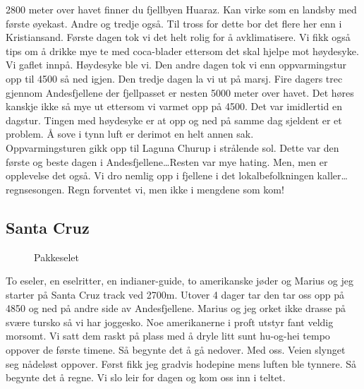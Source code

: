 2800 meter over havet finner du fjellbyen Huaraz. Kan virke som en
landsby med første øyekast. Andre og tredje også. Til tross for dette
bor det flere her enn i Kristiansand. Første dagen tok vi det helt
rolig for å avklimatisere. Vi  fikk også tips om å drikke mye te med coca-blader
ettersom det skal hjelpe mot høydesyke. Vi gaflet innpå. Høydesyke ble
vi. Den andre dagen tok vi enn oppvarmingstur opp til 4500 så ned
igjen. Den tredje dagen la vi ut på marsj. Fire dagers trec gjennom
Andesfjellene der fjellpasset er nesten 5000 meter over havet. Det
høres kanskje ikke så mye ut ettersom vi varmet opp på 4500. Det var
imidlertid en dagstur. Tingen med høydesyke er at opp og ned på samme
dag sjeldent er et problem. Å sove i tynn luft er derimot
en helt annen sak.\\

Oppvarmingsturen gikk opp til Laguna Churup i
strålende sol. Dette var den første og beste dagen i
Andesfjellene\ldots  Resten
var mye hating. Men, men er opplevelse det også. 
Vi dro nemlig opp i fjellene i det lokalbefolkningen kaller\ldots 
regnsesongen. Regn forventet vi, men ikke i mengdene som kom!\\ 



\subsection{Santa Cruz}

\begin{figure}[!h]
	\centering
\noindent{}
	\caption*{Pakkeselet}
\label{fig:pakkesel}
\end{figure}

To eseler, en eselritter, en indianer-guide, to amerikanske jøder og Marius og jeg
starter på Santa Cruz track ved 2700m. Utover 4 dager tar den tar oss opp på 4850 og
ned på andre side av Andesfjellene. Marius og jeg orket ikke drasse på
svære tursko så vi har joggesko. Noe amerikanerne i proft utstyr fant veldig
morsomt. Vi satt dem raskt på plass med å dryle litt sunt hu-og-hei
tempo oppover de første timene. Så begynte det å gå nedover. Med oss.
Veien slynget seg nådeløst oppover. Først fikk jeg gradvis hodepine
mens luften ble tynnere. Så begynte det å regne. Vi slo leir for
dagen og kom oss inn i teltet.\\

